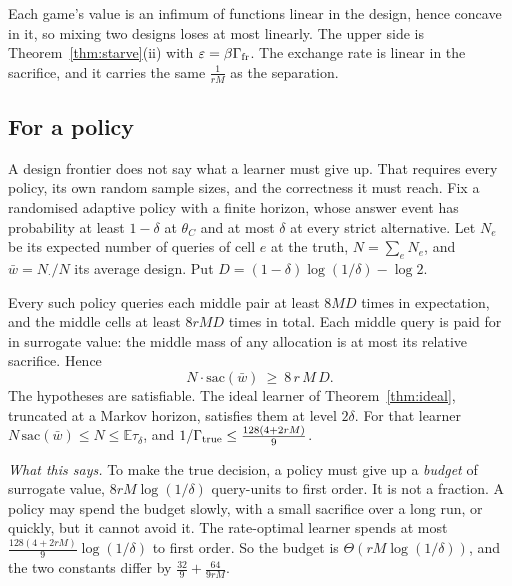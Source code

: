 
Each game's value is an infimum of functions linear in the design, hence concave in it, so
mixing two designs loses at most linearly. The upper side is Theorem~\ref{thm:starve}(ii) with
$\varepsilon=\beta\Gamma_{\rm fr}$. The exchange rate is linear in the sacrifice, and it
carries the same $\frac{1}{rM}$ as the separation.

\subsection{For a policy}

A design frontier does not say what a learner must give up. That requires every policy, its
own random sample sizes, and the correctness it must reach. Fix a randomised adaptive policy
with a finite horizon, whose answer event has probability at least $1-\delta$ at $\theta_{C}$
and at most $\delta$ at every strict alternative. Let $N_{e}$ be its expected number of queries
of cell $e$ at the truth, $N=\sum_{e}N_{e}$, and $\bar w=N_{\cdot}/N$ its average design. Put
$D=(1-\delta)\log(1/\delta)-\log2$.

\begin{theorem}
\label{thm:sacrifice}
Every such policy queries each middle pair at least $8MD$ times in expectation, and the middle
cells at least $8rMD$ times in total. Each middle query is paid for in surrogate value: the
middle mass of any allocation is at most its relative sacrifice. Hence
\[
N\cdot\mathrm{sac}(\bar w)\ \ge\ 8\,r\,M\,D .
\]
The hypotheses are satisfiable. The ideal learner of Theorem~\ref{thm:ideal}, truncated at a
Markov horizon, satisfies them at level $2\delta$. For that learner
$N\,\mathrm{sac}(\bar w)\le N\le\mathbb{E}\tau_{\delta}$, and
$1/\Gamma_{\rm true}\le\frac{128(4+2rM)}{9}$.
\end{theorem}


\emph{What this says.} To make the true decision, a policy must give up a \emph{budget} of
surrogate value, $8rM\log(1/\delta)$ query-units to first order. It is not a fraction. A policy
may spend the budget slowly, with a small sacrifice over a long run, or quickly, but it cannot
avoid it. The rate-optimal learner spends at most $\frac{128(4+2rM)}{9}\log(1/\delta)$ to first
order. So the budget is $\Theta(rM\log(1/\delta))$, and the two constants differ by
$\frac{32}{9}+\frac{64}{9rM}$.

